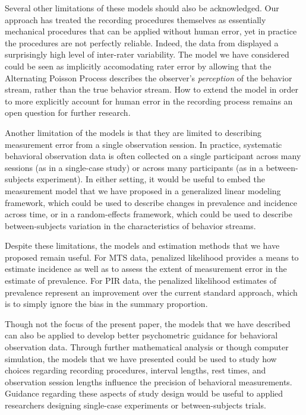 \documentclass[man, noextraspace, floatsintext]{apa6}\usepackage[]{graphicx}\usepackage[]{color}
\begin{document}
Several other limitations of these models should also be acknowledged. Our approach has treated the recording procedures themselves as essentially mechanical procedures that can be applied without human error, yet in practice the procedures are not perfectly reliable. Indeed, the data from \citet{Johnson2014reliability} displayed a surprisingly high level of inter-rater variability. The model we have considered could be seen as implicitly accomodating rater error by allowing that the Alternating Poisson Process describes the observer's \textit{perception} of the behavior stream, rather than the true behavior stream. How to extend the model in order to more explicitly account for human error in the recording process remains an open question for further research.

Another limitation of the models is that they are limited to describing measurement error from a single observation session. In practice, systematic behavioral observation data is often collected on a single participant across many sessions (as in a single-case study) or across many participants (as in a between-subjects experiment). In either setting, it would be useful to embed the measurement model that we have proposed in a generalized linear modeling framework, which could be used to describe changes in prevalence and incidence across time, or in a random-effects framework, which could be used to describe between-subjects variation in the characteristics of behavior streams.

Despite these limitations, the models and estimation methods that we have proposed remain useful. For MTS data, penalized likelihood provides a means to estimate incidence as well as to assess the extent of measurement error in the estimate of prevalence. For PIR data, the penalized likelihood estimates of prevalence represent an improvement over the current standard approach, which is to simply ignore the bias in the summary proportion. 

Though not the focus of the present paper, the models that we have described can also be applied to develop better psychometric guidance for behavioral observation data. Through further mathematical analysis or though computer simulation, the models that we have presented could be used to study how choices regarding recording procedures, interval lengths, rest times, and observation session lengths influence the precision of behavioral measurements. Guidance regarding these aspects of study design would be useful to applied researchers designing single-case experiments or between-subjects trials.
\end{document}
